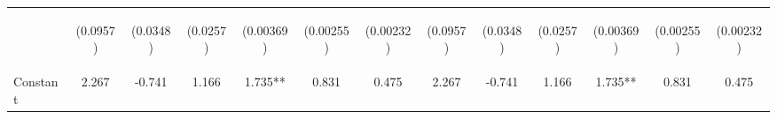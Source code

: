 \documentclass[]{article}
\begin{document}
\begin{center}
\begin{tabular}{lcccccccccccc}
\vspace{4pt} & \begin{footnotesize}(0.0957)\end{footnotesize} & \begin{footnotesize}(0.0348)\end{footnotesize} & \begin{footnotesize}(0.0257)\end{footnotesize} & \begin{footnotesize}(0.00369)\end{footnotesize} & \begin{footnotesize}(0.00255)\end{footnotesize} & \begin{footnotesize}(0.00232)\end{footnotesize} & \begin{footnotesize}(0.0957)\end{footnotesize} & \begin{footnotesize}(0.0348)\end{footnotesize} & \begin{footnotesize}(0.0257)\end{footnotesize} & \begin{footnotesize}(0.00369)\end{footnotesize} & \begin{footnotesize}(0.00255)\end{footnotesize} & \begin{footnotesize}(0.00232)\end{footnotesize} \\
Constant & 2.267 & -0.741 & 1.166 & 1.735** & 0.831 & 0.475 & 2.267 & -0.741 & 1.166 & 1.735** & 0.831 & 0.475 \\

\end{tabular}
\end{center}
\end{document}

